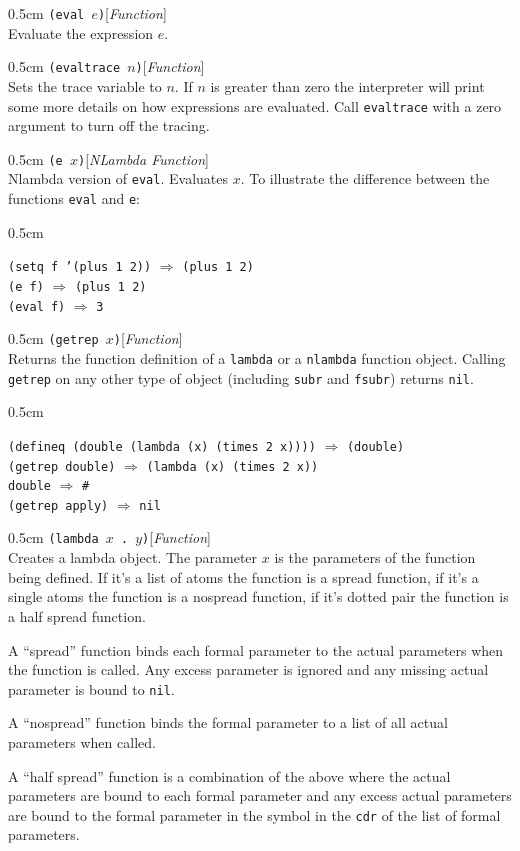 \documentclass[a4paper]{article}
\newcommand{\lisp}[1]{\texttt{#1}}
\newcommand{\NIL}{\lisp{nil}}
\newenvironment{examples}{
  \newcommand{\ex}[2]{
    \lisp{##1} $\Rightarrow$ \lisp{##2}\\
  }
  \begin{adjustwidth}{0.5cm}{}}{\end{adjustwidth}}
\newenvironment{defun}[2]{\begin{adjustwidth}{0.5cm}{}
    {\hspace*{-0.5cm}\lisp{#2}\hfill[\textit{#1}]\\}}
               {\end{adjustwidth}}
\begin{document}
\begin{defun}{Function}{(eval $e$)}
  Evaluate the expression $e$.
\end{defun}

\begin{defun}{Function}{(evaltrace $n$)}
  Sets the trace variable to $n$. If $n$ is greater than zero the
  interpreter will print some more details on how expressions are
  evaluated. Call \lisp{evaltrace} with a zero argument to turn off
  the tracing.
\end{defun}

\begin{defun}{NLambda Function}{(e $x$)}
  Nlambda version of \lisp{eval}. Evaluates $x$. To illustrate the
  difference between the functions \lisp{eval} and \lisp{e}:

  \begin{examples}
    \ex{(setq f '(plus 1 2))}{(plus 1 2)}
    \ex{(e f)}{(plus 1 2)}
    \ex{(eval f)}{3}
  \end{examples}

\end{defun}

\begin{defun}{Function}{(getrep $x$)}
  Returns the function definition of a \lisp{lambda} or a
  \lisp{nlambda} function object. Calling \lisp{getrep} on any other
  type of object (including \lisp{subr} and \lisp{fsubr}) returns
  \NIL.

  \begin{examples}
    \ex{(defineq (double (lambda (x) (times 2 x))))}{(double)}
    \ex{(getrep double)}{(lambda (x) (times 2 x))}
    \ex{double}{\#<lambda 7fec0a810ce0>}
    \ex{(getrep apply)}{nil}
  \end{examples}

\end{defun}


\begin{defun}{Function}{(lambda $x$ .\ $y$)}
  Creates a lambda object. The parameter $x$ is the parameters of the
  function being defined. If it's a list of atoms the function is a
  spread function, if it's a single atoms the function is a nospread
  function, if it's dotted pair the function is a half spread
  function.

  A ``spread'' function binds each formal parameter to the actual
  parameters when the function is called. Any excess parameter is
  ignored and any missing actual parameter is bound to \NIL.

  A ``nospread'' function binds the formal parameter to a list of all
  actual parameters when called.

  A ``half spread'' function is a combination of the above where the
  actual parameters are bound to each formal parameter and any excess
  actual parameters are bound to the formal parameter in the
  symbol in the \lisp{cdr} of the list of formal parameters.
\end{defun}
\end{document}
